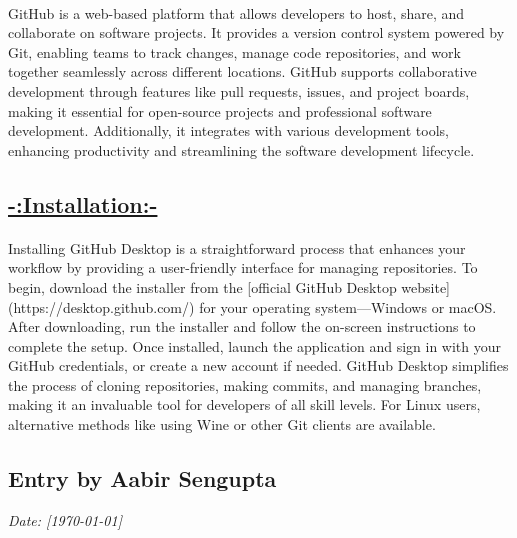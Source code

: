 \documentclass[a4paper,12pt]{article}
\begin{document}
\paragraph{\noindent}{GitHub is a web-based platform that allows developers to host, share, and collaborate on software projects. It provides a version control system powered by Git, enabling teams to track changes, manage code repositories, and work together seamlessly across different locations. GitHub supports collaborative development through features like pull requests, issues, and project boards, making it essential for open-source projects and professional software development. Additionally, it integrates with various development tools, enhancing productivity and streamlining the software development lifecycle.}

\vspace{1 cm}
\subsection*{\underline{-:Installation:-}}
\paragraph{\setlength{\parindent}{0pt}}{Installing GitHub Desktop is a straightforward process that enhances your workflow by providing a user-friendly interface for managing repositories. To begin, download the installer from the [official GitHub Desktop website](https://desktop.github.com/) for your operating system—Windows or macOS. After downloading, run the installer and follow the on-screen instructions to complete the setup. Once installed, launch the application and sign in with your GitHub credentials, or create a new account if needed. GitHub Desktop simplifies the process of cloning repositories, making commits, and managing branches, making it an invaluable tool for developers of all skill levels. For Linux users, alternative methods like using Wine or other Git clients are available.}


\newpage
{}
\vspace{-2cm}
\subsection*{Entry by Aabir Sengupta}
\textit{Date: [\today]}\\
\end{document}
